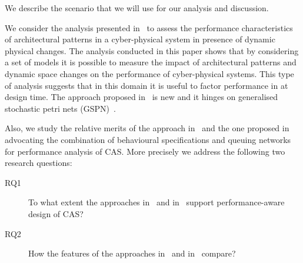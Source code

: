 We describe the scenario that we will use for our analysis and
discussion.
%
\eMcomm[tbc]{}


\hsl[CAS = CPS?\\ \textbf{If}
CAS $\neq$ CPS
\\\textbf{then}
\cite{pt21icsa} not designed for CAS AND \cite{itt20} not designed for changes
\\
\textbf{else} ???
\\
\textbf{fi}]

We consider the analysis presented in~\cite{pt21icsa} to assess the
performance characteristics of architectural patterns in a
cyber-physical system in presence of dynamic physical changes.
%
The analysis conducted in this paper shows that by considering a set
of models it is possible to measure the impact of architectural
patterns and dynamic space changes on the performance of
cyber-physical systems.
%
This type of analysis suggests that in this domain it is useful to
factor performance in at design time.
%
The approach proposed in~\cite{pt21icsa} is new and it hinges on
generalised stochastic petri nets (GSPN)~\cite{gspn}.

%
Also, we study the relative merits of the approach in~\cite{pt21icsa}
and the one proposed in~\cite{itt20} advocating the combination of
behavioural specifications and queuing networks~\cite{qn} for
performance analysis of CAS.
%
More precisely we address the following two research questions:
\begin{description}
\item[RQ1] To what extent the approaches in~\cite{pt21icsa}
  and in~\cite{itt20} support performance-aware design of CAS?
\item[RQ2] How the features of the approaches in~\cite{pt21icsa}
  and in~\cite{itt20} compare?
\end{description}

